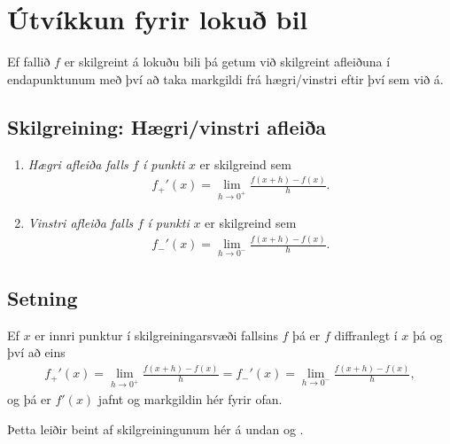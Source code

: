 \documentclass[b5paper,11pt,icelandic]{sphinxmanual}
\begin{document}
\section{Útvíkkun fyrir lokuð bil}
\label{kafli03:utvikkun-fyrir-loku-bil}
Ef fallið \(f\) er skilgreint á lokuðu bili þá getum við skilgreint
afleiðuna í endapunktunum með því að taka markgildi frá hægri/vinstri
eftir því sem við á.


\subsection{Skilgreining: Hægri/vinstri afleiða}
\label{kafli03:index-2}\label{kafli03:skilgreining-haegri-vinstri-afleia}\begin{enumerate}
\item {} 
\emph{Hægri afleiða falls} \(f\) \emph{í punkti} \(x\) er skilgreind
sem
\begin{equation*}
\begin{split}f_+'(x)=\lim_{h\rightarrow 0^+}\frac{f(x+h)-f(x)}{h}.\end{split}
\end{equation*}
\item {} 
\emph{Vinstri afleiða falls} \(f\) \emph{í punkti} \(x\) er
skilgreind sem
\begin{equation*}
\begin{split}f_-'(x)=\lim_{h\rightarrow 0^-}\frac{f(x+h)-f(x)}{h}.\end{split}
\end{equation*}
\end{enumerate}


\subsection{Setning}
\label{kafli03:id2}
Ef \(x\) er innri punktur í skilgreiningarsvæði fallsins \(f\)
þá er \(f\) diffranlegt í \(x\) þá og því að eins
\begin{equation*}
\begin{split}f_+'(x)=\lim_{h\rightarrow 0^+}\frac{f(x+h)-f(x)}{h}
=   f_-'(x)=\lim_{h\rightarrow 0^-}\frac{f(x+h)-f(x)}{h},\end{split}
\end{equation*}
og þá er \(f'(x)\) jafnt og markgildin hér fyrir ofan.

Þetta leiðir beint af skilgreiningunum hér á undan og
{\hyperref[kafli02:setning\string-hv\string-markgildi]{}}.
\end{document}

